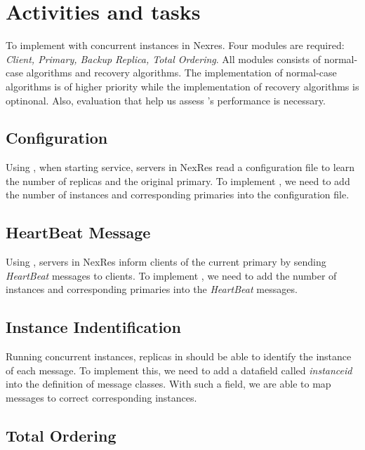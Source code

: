 \section{Activities and tasks}

\par To implement \RCC{} with concurrent \PBFT{} instances in Nexres. Four modules are required: \emph{Client, 
Primary, Backup Replica, Total Ordering}. All modules consists of normal-case algorithms and recovery algorithms. 
The implementation of normal-case algorithms is of higher priority while the implementation of recovery algorithms 
is optinonal. Also, evaluation that help us assess \RCC{}'s performance is necessary.

\subsection{Configuration}

\par Using \PBFT{}, when starting service, servers in NexRes read a configuration file to learn the number of replicas 
and the original primary. To implement \RCC{}, we need to add the number of instances and corresponding primaries into 
the configuration file. 

\subsection{HeartBeat Message}

\par Using \PBFT{}, servers in NexRes inform clients of the current primary by sending \emph{HeartBeat} messages to 
clients. To implement \RCC{}, we need to add the number of instances and corresponding primaries into 
the \emph{HeartBeat} messages.

\subsection{Instance Indentification}

\par Running concurrent instances, replicas in \RCC{} should be able to identify the instance of each message. 
To implement this, we need to add a datafield called \emph{instanceid} into the definition of message classes. With 
such a field, we are able to map messages to correct corresponding instances.

\subsection{Total Ordering}


